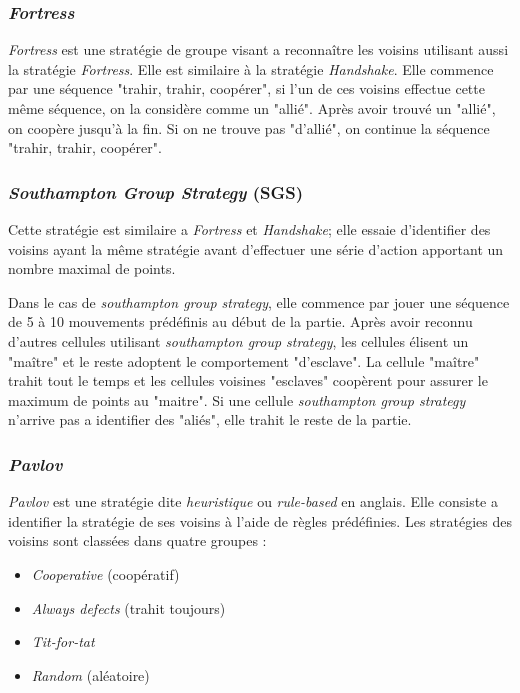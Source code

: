 \documentclass[a4paper, french]{article}
\begin{document}
\subsubsection{\textit{Fortress}}
\textit{Fortress} est une stratégie de groupe visant a reconnaître les voisins utilisant aussi la stratégie \textit{Fortress}. Elle est similaire à la stratégie \textit{Handshake}. Elle commence par une séquence "trahir, trahir, coopérer", si l'un de ces voisins effectue cette même séquence, on la considère comme un "allié". Après avoir trouvé un "allié", on coopère jusqu'à la fin. Si on ne trouve pas "d'allié", on continue la séquence "trahir, trahir, coopérer".

\subsubsection{\textit{Southampton Group Strategy} (SGS)}
Cette stratégie est similaire a \textit{Fortress} et \textit{Handshake}; elle essaie d'identifier des voisins ayant la même stratégie avant d'effectuer une série d'action apportant un nombre maximal de points. 

Dans le cas de \textit{southampton group strategy}, elle commence par jouer une séquence de 5 à 10 mouvements prédéfinis au début de la partie. Après avoir reconnu d'autres cellules utilisant \textit{southampton group strategy}, les cellules élisent un "maître" et le reste adoptent le comportement "d'esclave". La cellule "maître" trahit tout le temps et les cellules voisines "esclaves" coopèrent pour assurer le maximum de points au "maitre". Si une cellule \textit{southampton group strategy} n'arrive pas a identifier des "aliés", elle trahit le reste de la partie.

\subsubsection{\textit{Pavlov}}
\textit{Pavlov} est une stratégie dite \textit{heuristique} ou \textit{rule-based} en anglais. Elle consiste a identifier la stratégie de ses voisins à l'aide de règles prédéfinies. Les stratégies des voisins sont classées dans quatre groupes :
\begin{itemize}
    \item \textit{Cooperative} (coopératif)
    \item \textit{Always defects} (trahit toujours)
    \item \textit{Tit-for-tat}
    \item \textit{Random} (aléatoire)
\end{itemize}
\end{document}
